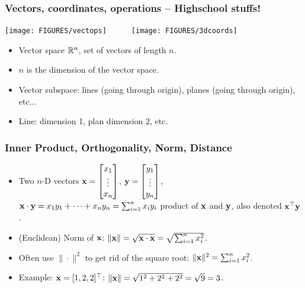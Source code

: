\documentclass[8pt,dvipsnames]{beamer}
\newcommand{\myemph}[1]{{\color{blue}{#1}}}
\begin{document}
\begin{frame}
  \frametitle{Vectors, coordinates, operations -- Highschool stuffs!}
  \begin{center}
     \texttt{[image: FIGURES/vectops]}~~~~~~\texttt{[image: FIGURES/3dcoords]}
  \end{center}
  \begin{itemize}
  \item Vector space ${\mathbb R}^n$, set of vectors of length $n$. 
  \item $n$ is the dimension of the vector space.
  \item Vector subspace: lines (going through origin), planes (going through origin), etc...
  \item Line: dimension 1, plan dimension 2, etc.
  \end{itemize}
\end{frame}


\begin{frame}
  \frametitle{Inner Product, Orthogonality, Norm, Distance}
  \begin{itemize}[<+->]
  \item Two $n$-D vectors
    $ {\bf x} = \begin{bmatrix}
      x_1\\\vdots\\ x_n
    \end{bmatrix}
    $,
    $ {\bf y} = \begin{bmatrix}
      y_1\\\vdots\\ y_n
    \end{bmatrix}$,
    ${\bf x}\cdot{\bf y} = x_1y_1 + \dots + x_n y_n = \sum_{i=1}^nx_i y_i$
    \myemph{Inner/Dot/Scalar} product of ${\bf x}$ and ${\bf y}$, also denoted ${\bf x}^\top {\bf y}$.\vfill
  \item (Euclidean) Norm of ${\bf x}$: $\|{\bf x}\| = \sqrt{{\bf x}\cdot{\bf x}} = \sqrt{\sum_{i=1}^n x_i^2}$.
    \vfill
  \item Often use $\|\cdot\|^2$ to get rid of the square root: $\|{\bf x}\|^2 = \sum_{i=1}^n x_i^2$.
    \vfill
  \item Example: ${\bf x} = [1, 2, 2]^\top$: $\|{\bf x}\| = \sqrt{1^2 + 2^2 + 2^2} = \sqrt{9} = 3$.
  \end{itemize}
\end{frame}
\end{document}
